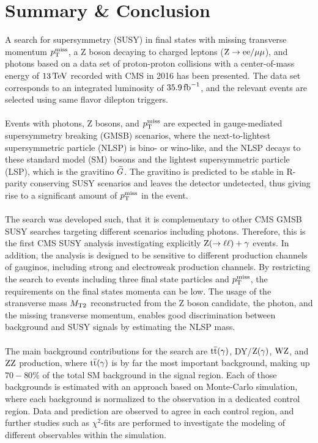 \chapter{Summary \& Conclusion}\label{chap:conclusion}

A search for supersymmetry (SUSY) in final states with missing transverse momentum $p_{\mathrm{T}}^\text{miss}$, a Z boson decaying to charged leptons ($\mathrm{Z}\to\mathrm{e}\mathrm{e}/{\mu}\mu$), and photons based on a data set of proton-proton collisions with a center-of-mass energy of $13\,\text{Te\hspace{-.08em}V}$ recorded with CMS in 2016 has been presented. The data set corresponds to an integrated luminosity of $35.9\mbox{\ensuremath{\,\text{fb}^\text{$-$1}}}$, and the relevant events are selected using same flavor dilepton triggers.\\\\
Events with photons, Z bosons, and $p_{\mathrm{T}}^\text{miss}$ are expected in gauge-mediated supersymmetry breaking (GMSB) scenarios, where the next-to-lightest supersymmetric particle (NLSP) is bino- or wino-like, and the NLSP decays to these standard model (SM) bosons and the lightest supersymmetric particle (LSP), which is the gravitino $\widetilde{G}$. The gravitino is predicted to be stable in R-parity conserving SUSY scenarios and leaves the detector undetected, thus giving rise to a significant amount of $p_{\mathrm{T}}^\text{miss}$ in the event.\\\\
The search was developed such, that it is complementary to other CMS GMSB SUSY searches targeting different scenarios including photons. Therefore, this is the first CMS SUSY analysis investigating explicitly $\mathrm{Z}(\to\ell\ell)+\gamma$ events. In addition, the analysis is designed to be sensitive to different production channels of gauginos, including strong and electroweak production channels. By restricting the search to events including three final state particles and $p_{\mathrm{T}}^\text{miss}$, the requirements on the final states momenta can be low. The usage of the stransverse mass $M_{\mathrm{T2}}$ reconstructed from the Z boson candidate, the photon, and the missing transverse momentum, enables good discrimination between background and SUSY signals by estimating the NLSP mass.\\\\
The main background contributions for the search are ${\mathrm{t}\overline{\mathrm{t}}}(\gamma)$, DY/$\mathrm{Z}(\gamma)$, $\mathrm{W}\mathrm{Z}$, and $\mathrm{Z}\mathrm{Z}$ production, where ${\mathrm{t}\overline{\mathrm{t}}}(\gamma)$ is by far the most important background, making up $70-80\%$ of the total SM background in the signal region. Each of those backgrounds is estimated with an approach based on Monte-Carlo simulation, where each background is normalized to the observation in a dedicated control region. Data and prediction are observed to agree in each control region, and further studies such as $\chi^2$-fits are performed to investigate the modeling of different observables within the simulation.\\
